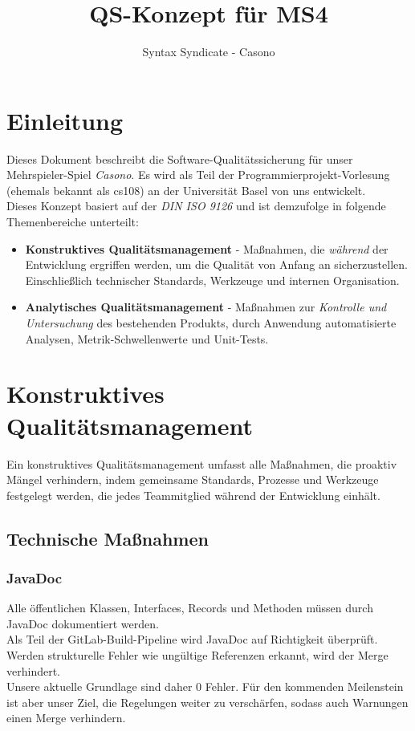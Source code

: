 \documentclass{article}
\title{QS-Konzept für MS4}
\author{Syntax Syndicate - Casono}
\begin{document}
\maketitle


\section{Einleitung}
Dieses Dokument beschreibt die Software-Qualitätssicherung für unser Mehrspieler-Spiel \textit{Casono}. Es wird als Teil der Programmierprojekt-Vorlesung (ehemals bekannt als cs108) an der Universität Basel von uns entwickelt.\\

Dieses Konzept basiert auf der \textit{DIN ISO 9126} und ist demzufolge in folgende Themenbereiche unterteilt:
\begin{itemize}
  \item \textbf{Konstruktives Qualitätsmanagement} - Maßnahmen, die \emph{während} der Entwicklung ergriffen werden, um die Qualität von Anfang an sicherzustellen.
  Einschließlich technischer Standards, Werkzeuge und internen Organisation.
  \item \textbf{Analytisches Qualitätsmanagement} - Maßnahmen zur \emph{Kontrolle und Untersuchung} des bestehenden Produkts, durch Anwendung automatisierte Analysen, Metrik-Schwellenwerte und Unit-Tests.
\end{itemize}


\section{Konstruktives Qualitätsmanagement}
Ein konstruktives Qualitätsmanagement umfasst alle Maßnahmen, die proaktiv Mängel verhindern, indem gemeinsame Standards, Prozesse und Werkzeuge festgelegt werden, die jedes Teammitglied während der Entwicklung einhält.

\subsection{Technische Maßnahmen}

\subsubsection{JavaDoc}
Alle öffentlichen Klassen, Interfaces, Records und Methoden müssen durch JavaDoc dokumentiert werden.\\
Als Teil der GitLab-Build-Pipeline wird JavaDoc auf Richtigkeit überprüft. Werden strukturelle Fehler wie ungültige Referenzen erkannt, wird der Merge verhindert.\\
Unsere aktuelle Grundlage sind daher 0 Fehler. Für den kommenden Meilenstein ist aber unser Ziel, die Regelungen weiter zu verschärfen, sodass auch Warnungen einen Merge verhindern.\\
\end{document}
